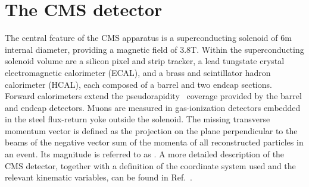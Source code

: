 \section{The CMS detector}
\label{sec:detector}

The central feature of the CMS apparatus is a superconducting solenoid
of 6\unit{m} internal diameter, providing a magnetic field of
3.8\unit{T}. Within the superconducting solenoid volume are a silicon
pixel and strip tracker, a lead tungstate crystal electromagnetic
calorimeter (ECAL), and a brass and scintillator hadron calorimeter
(HCAL), each composed of a barrel and two endcap sections. Forward
calorimeters extend the pseudorapidity~\cite{ref:CMS} coverage
provided by the barrel and endcap detectors. Muons are measured in
gas-ionization detectors embedded in the steel flux-return yoke
outside the solenoid. The missing transverse momentum vector
\ptvecmiss is defined as the projection on the plane perpendicular to
the beams of the negative vector sum of the momenta of all
reconstructed particles in an event. Its magnitude is referred to as
\ETmiss. A more detailed description of the CMS detector, together
with a definition of the coordinate system used and the relevant
kinematic variables, can be found in Ref.~\cite{ref:CMS}.

